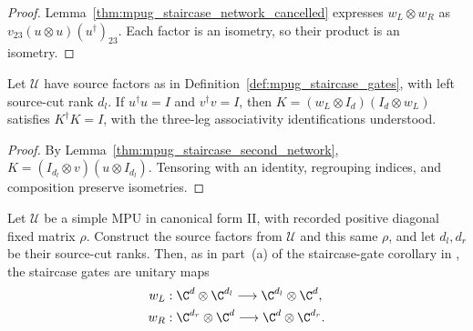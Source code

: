 \begin{proof}\leanok
    Lemma~\ref{thm:mpug_staircase_network_cancelled} expresses
    $w_L\otimes w_R$ as $v_{23}(u\otimes u)(u^\dagger)_{23}$.
    Each factor is an isometry, so their product is an isometry.
\end{proof}

\begin{lemma}
    \label{thm:mpug_staircase_second_network_isometry}
    \leanok
    Let $\mathcal U$ have source factors as in
    Definition~\ref{def:mpug_staircase_gates}, with left source-cut rank
    $d_l$. If $u^\dagger u=I$ and $v^\dagger v=I$, then
    $K=(w_L\otimes I_d)(I_d\otimes w_L)$ satisfies $K^\dagger K=I$,
    with the three-leg associativity identifications understood.
\end{lemma}

\begin{proof}\leanok
    By Lemma~\ref{thm:mpug_staircase_second_network},
    $K=(I_{d_l}\otimes v)(u\otimes I_{d_l})$.
    Tensoring with an identity, regrouping indices, and composition
    preserve isometries.
\end{proof}

\begin{lemma}
    \label{thm:mpug_staircase_gates_unitary}
    \leanok
    Let $\mathcal U$ be a simple MPU in canonical form II, with recorded
    positive diagonal fixed matrix $\rho$. Construct the source factors
    from $\mathcal U$ and this same $\rho$, and let $d_l,d_r$ be their
    source-cut ranks. Then, as in part~(a) of the staircase-gate
    corollary in \cite[lines~811--1012]{FrancoRubio2025MPUGauging}, the
    staircase gates are unitary maps
    \begin{align}
        w_L & :\C^d\otimes\C^{d_l}\longrightarrow\C^{d_l}\otimes\C^d, \\
        w_R & :\C^{d_r}\otimes\C^d\longrightarrow\C^d\otimes\C^{d_r}.
    \end{align}
\end{lemma}

